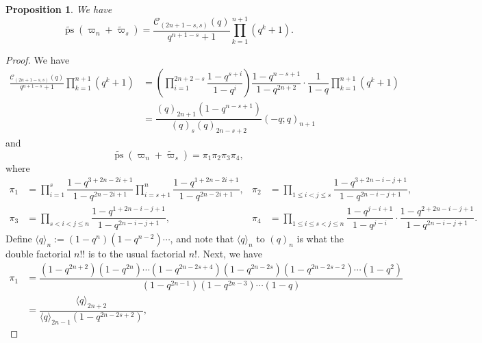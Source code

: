 \documentclass[11pt, leqno]{amsart}
\theoremstyle{plain}
\newtheorem{proposition}[theorem]{Proposition}
\theoremstyle{definition}
\numberwithin{equation}{section}
\newcommand{\fw}{\varpi} %
\newcommand{\tfw}{\widetilde{\fw}} %
\newcommand{\seteq}{\mathbin{:=}}
\newcommand{\Cat}{\mathcal{C}} %
\newcommand{\qPdf}[1]{\langle q \rangle_{#1}} %
\newcommand{\ps}{\operatorname{ps}} %
\newcommand{\nps}{\widetilde{\ps}} %
\begin{document}
\begin{proposition}
\label{prop:B_near_spin_q_char}
We have
\[
\nps(\fw_n + \tfw_s) = \frac{\Cat_{(2n+1-s,s)}(q)}{q^{n+1-s} + 1} \prod_{k=1}^{n+1} (q^k + 1).
\]
\end{proposition}

\begin{proof}
We have
\begin{equation}
\label{eq:B_near_RHS}
\begin{split}
\frac{\Cat_{(2n+1-s,s)}(q)}{q^{n+1-s} + 1} \prod_{k=1}^{n+1} (q^k + 1) & = \left( \prod_{i=1}^{2n+2-s} \dfrac{1-q^{s+i}}{1-q^i} \right) \dfrac{1-q^{n-s+1}}{1-q^{2n+2}} \cdot \dfrac{1}{1-q}\prod_{k=1}^{n+1} (q^k + 1)
\\ & = \dfrac{(q)_{2n+1} (1-q^{n-s+1})}{(q)_s (q)_{2n-s+2}} (-q; q)_{n+1}
\end{split}
\end{equation}
and
\[
\nps(\fw_n + \tfw_s) = \pi_1 \pi_2 \pi_3 \pi_4,
\]
where
\begin{align*}
\pi_1 & = \prod_{i=1}^s \dfrac{1-q^{3+2n-2i+1}}{1-q^{2n-2i+1}} \prod_{i=s+1}^n \dfrac{1-q^{1+2n-2i+1}}{1-q^{2n-2i+1}},
&
\pi_2 & = \prod_{1 \leq i < j \leq s} \dfrac{1-q^{3+2n-i-j+1}}{1-q^{2n-i-j+1}},
\\
\pi_3 & = \prod_{s < i < j \leq n} \dfrac{1-q^{1+2n-i-j+1}}{1-q^{2n-i-j+1}},
&
\pi_4 & = \prod_{1 \leq i \leq s < j \leq n} \dfrac{1-q^{j-i+1}}{1-q^{j-i}} \cdot \dfrac{1-q^{2+2n-i-j+1}}{1-q^{2n-i-j+1}}.
\end{align*}
Define $\qPdf{n} \seteq (1 - q^n) (1 - q^{n-2}) \cdots$, and note that $\qPdf{n}$ to $(q)_n$ is what the double factorial $n!!$ is to the usual factorial $n!$. 
Next, we have
\begin{align*}
\pi_1 & = \dfrac{(1-q^{2n+2}) (1-q^{2n}) \cdots (1-q^{2n-2s+4}) (1-q^{2n-2s}) (1-q^{2n-2s-2}) \cdots (1-q^2)}{(1-q^{2n-1}) (1-q^{2n-3}) \cdots (1-q)}
\\ & = \dfrac{\qPdf{2n+2}}{\qPdf{2n-1} (1-q^{2n-2s+2})},
%

\end{align*}
\end{proof}
\end{document}
